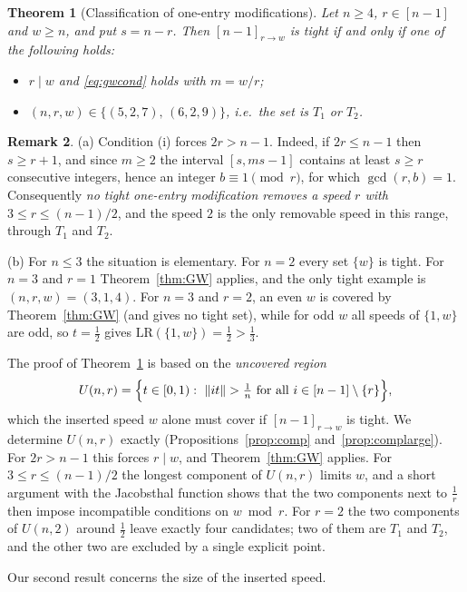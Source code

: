 \documentclass[11pt]{article}
\newtheorem{theorem}{Theorem}[section]
\theoremstyle{definition}
\newtheorem{remark}[theorem]{Remark}
\newcommand{\LR}{\mathrm{LR}}
\newcommand{\norm}[1]{\left\lVert #1 \right\rVert}
\begin{document}
\begin{theorem}[Classification of one-entry modifications]\label{thm:A}
Let $n\ge4$, $r\in[n-1]$ and $w\ge n$, and put $s=n-r$. Then
$[n-1]_{r\to w}$ is tight if and only if one of the following holds:
\begin{itemize}
\item[\textup{(i)}] $r\mid w$ and \eqref{eq:gwcond} holds with $m=w/r$;
\item[\textup{(ii)}] $(n,r,w)\in\{(5,2,7),\,(6,2,9)\}$, i.e.\ the set is
$T_1$ or $T_2$.
\end{itemize}
\end{theorem}

\begin{remark}\label{rem:A}
(a) Condition \textup{(i)} forces $2r>n-1$. Indeed, if $2r\le n-1$ then
$s\ge r+1$, and since $m\ge2$ the interval $[s,ms-1]$ contains at least
$s\ge r$ consecutive integers, hence an integer $b\equiv1\pmod r$, for
which $\gcd(r,b)=1$. Consequently \emph{no tight one-entry
modification removes a speed $r$ with $3\le r\le(n-1)/2$}, and the
speed $2$ is the only removable speed in this range, through $T_1$ and
$T_2$.

(b) For $n\le3$ the situation is elementary. For $n=2$ every set
$\{w\}$ is tight. For $n=3$ and $r=1$ Theorem~\ref{thm:GW} applies, and
the only tight example is $(n,r,w)=(3,1,4)$. For $n=3$ and $r=2$, an
even $w$ is covered by Theorem~\ref{thm:GW} (and gives no tight set),
while for odd $w$ all speeds of $\{1,w\}$ are odd, so $t=\frac12$ gives
$\LR(\{1,w\})=\frac12>\frac13$.
\end{remark}

The proof of Theorem~\ref{thm:A} is based on the \emph{uncovered region}
\[
U(n,r)=\Bigl\{t\in[0,1):\ \norm{it}>\tfrac1n\ \text{for all }
i\in[n-1]\setminus\{r\}\Bigr\},
\]
which the inserted speed $w$ alone must cover if $[n-1]_{r\to w}$ is
tight. We determine $U(n,r)$ exactly (Propositions~\ref{prop:comp}
and~\ref{prop:complarge}). For $2r>n-1$ this forces $r\mid w$, and
Theorem~\ref{thm:GW} applies. For $3\le r\le(n-1)/2$ the longest
component of $U(n,r)$ limits $w$, and a short argument with the
Jacobsthal function shows that the two components next to $\frac1r$
then impose incompatible conditions on $w\bmod r$. For $r=2$ the two
components of $U(n,2)$ around $\frac12$ leave exactly four candidates;
two of them are $T_1$ and $T_2$, and the other two are excluded by a
single explicit point.

Our second result concerns the size of the inserted speed.
\end{document}
